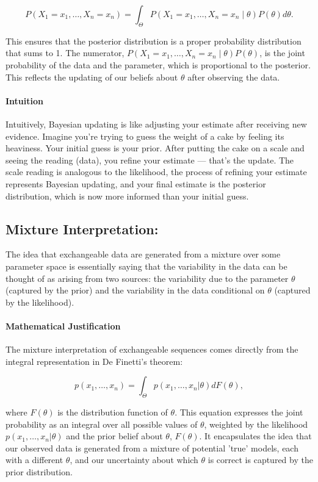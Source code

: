 \documentclass{article}
\begin{document}
\[
P(X_1 = x_1, \ldots, X_n = x_n) = \int_{\Theta} P(X_1 = x_1, \ldots, X_n = x_n \mid \theta) P(\theta) d\theta.
\]

This ensures that the posterior distribution is a proper probability distribution that sums to 1. The numerator, \( P(X_1 = x_1, \ldots, X_n = x_n \mid \theta) P(\theta) \), is the joint probability of the data and the parameter, which is proportional to the posterior. This reflects the updating of our beliefs about \( \theta \) after observing the data.

\paragraph{Intuition}
Intuitively, Bayesian updating is like adjusting your estimate after receiving new evidence. Imagine you're trying to guess the weight of a cake by feeling its heaviness. Your initial guess is your prior. After putting the cake on a scale and seeing the reading (data), you refine your estimate — that's the update. The scale reading is analogous to the likelihood, the process of refining your estimate represents Bayesian updating, and your final estimate is the posterior distribution, which is now more informed than your initial guess. 

\subsection{Mixture Interpretation:}
    The idea that exchangeable data are generated from a mixture over some parameter space is essentially saying that the variability in the data can be thought of as arising from two sources: the variability due to the parameter \( \theta \) (captured by the prior) and the variability in the data conditional on \( \theta \) (captured by the likelihood).
\paragraph{Mathematical Justification}
The mixture interpretation of exchangeable sequences comes directly from the integral representation in De Finetti's theorem:

\[
p(x_1, \ldots, x_n) = \int_{\Theta} p(x_1, \ldots, x_n | \theta) dF(\theta),
\]

where \( F(\theta) \) is the distribution function of \( \theta \). This equation expresses the joint probability as an integral over all possible values of \( \theta \), weighted by the likelihood \( p(x_1, \ldots, x_n | \theta) \) and the prior belief about \( \theta \), \( F(\theta) \). It encapsulates the idea that our observed data is generated from a mixture of potential 'true' models, each with a different \( \theta \), and our uncertainty about which \( \theta \) is correct is captured by the prior distribution.
\end{document}

